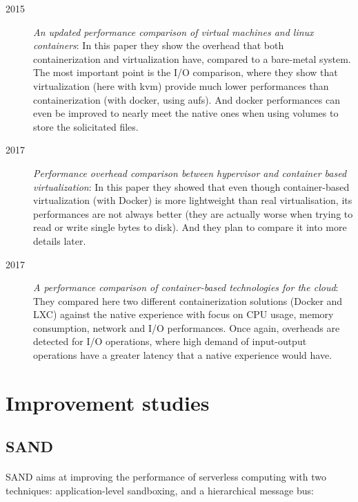 \begin{description}
  \item[2015] \textit{An updated performance comparison of virtual machines and linux containers}\cite{felter2015updated}:  In this paper they show the overhead that both containerization and virtualization have, compared to a bare-metal system.  The most important point is the I/O comparison, where they show that virtualization (here with kvm) provide much lower performances than containerization (with docker, using aufs).  And docker performances can even be improved to nearly meet the native ones when using volumes to store the solicitated files.
  
  \item[2017] \textit{Performance overhead comparison between hypervisor and container based virtualization}\cite{li2017performance}:  In this paper they showed that even though container-based virtualization (with Docker) is more lightweight than real virtualisation, its performances are not always better (they are actually worse when trying to read or write single bytes to disk).  And they plan to compare it into more details later.
  
  \item[2017] \textit{A performance comparison of container-based technologies for the cloud}\cite{kozhirbayev2017performance}: They compared here two different containerization solutions (Docker and LXC) against the native experience with focus on CPU usage, memory consumption, network and I/O performances.  Once again, overheads are detected for I/O operations, where high demand of input-output operations have a greater latency that a native experience would have.
\end{description}

\section{Improvement studies}

\subsection{SAND} 
\paragraph{}SAND\cite{akkus2018sand} aims at improving the performance of serverless computing with two techniques: application-level sandboxing, and a hierarchical message bus:

